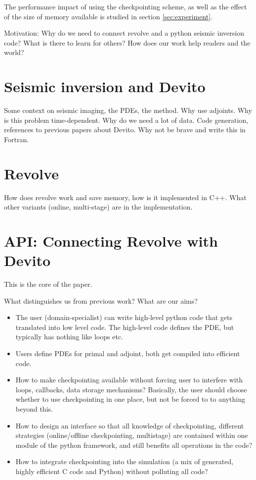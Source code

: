 \documentclass[sigconf]{acmart}
\begin{document}
The performance impact of using the checkpointing scheme, as well as
the effect of the size of memory available is studied in section
\ref{sec:experiment}. 

Motivation: Why do we need to connect revolve and a python seismic inversion code? What is there to
learn for others? How does our work help readers and the world?

\section{Seismic inversion and Devito}
\label{sec:inversion_devito}
Some context on seismic imaging, the PDEs, the method. Why use
adjoints. Why is this problem time-dependent. Why do we need a lot of
data.
Code generation, references to previous papers about Devito. Why not
be brave and write this in Fortran.

\section{Revolve}
\label{sec:revolve}
How does revolve work and save memory, how is it implemented in C++. What other variants (online,
multi-stage) are in the implementation.

\section{API: Connecting Revolve with Devito}
\label{sec:api}
This is the core of the paper.

What distinguishes us from previous work? What are our aims?
\begin{itemize}
\item The user (domain-specialist) can write high-level python code that gets translated into low
level code. The high-level code defines the PDE, but typically has nothing like loops etc.
\item Users define PDEs for primal and adjoint, both get compiled into efficient code.
\item How to make checkpointing available without forcing user to interfere with loops, callbacks,
data storage mechanisms? Basically, the user should choose whether to use checkpointing in one
place, but not be forced to to anything beyond this.
\item How to design an interface so that all knowledge of checkpointing, different strategies
(online/offline checkpointing, multistage) are contained within one module of the python framework,
and still benefits all operations in the code?
\item How to integrate checkpointing into the simulation (a mix of generated, highly efficient C
code and Python) without polluting all code?
\end{itemize}
\end{document}
